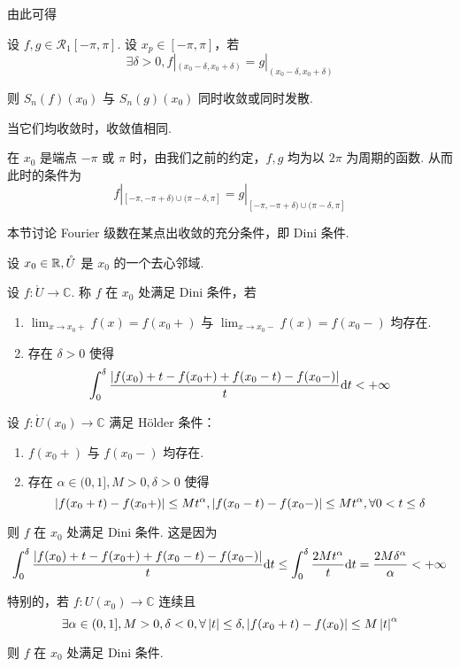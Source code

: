 由此可得

\begin{inference}[局部化准则]
    设 $f,g\in\mathcal{R}_1[-\pi,\pi]$. 设 $x_p\in[-\pi,\pi]$，若
$$
\exists\delta>0,f|_{(x_0-\delta,x_0+\delta)}=g|_{(x_0-\delta,x_0+\delta)}
$$

    则 $S_n(f)(x_0)$ 与 $S_n(g)(x_0)$ 同时收敛或同时发散.

    当它们均收敛时，收敛值相同.
\end{inference}

\begin{hint}
    在 $x_0$ 是端点 $-\pi$ 或 $\pi$ 时，由我们之前的约定，$f,g$ 均为以 $2\pi$ 为周期的函数. 从而此时的条件为
$$
f|_{[-\pi,-\pi+\delta)\cup(\pi-\delta,\pi]}=g|_{{[-\pi,-\pi+\delta)\cup(\pi-\delta,\pi]}}
$$
\end{hint}


本节讨论 Fourier 级数在某点出收敛的充分条件，即 Dini 条件.

\begin{definition}
    设 $x_0\in\mathbb{R},\mathring{U}$ 是 $x_0$ 的一个去心邻域.

    设 $f:\mathring{U}\to\mathbb{C}$. 称 $f$ 在 $x_0$ 处满足 Dini 条件，若

    \begin{enumerate}
        \item $\displaystyle\lim_{x\to x_0+}f(x)=f(x_0+)$ 与 $\displaystyle\lim_{x\to x_0-}f(x)=f(x_0-)$ 均存在.
        
        \item 存在 $\delta>0$ 使得
$$
\int_0^{\delta}\frac{\left\lvert{f(x_0)+t-f(x_0+)+f(x_0-t)-f(x_0-)}\right\rvert}{t}\mathrm{d} t<+\infty
$$
    \end{enumerate}
\end{definition}

\begin{example}
    设 $f:\mathring{U}(x_0)\to\mathbb{C}$ 满足 Hölder 条件：

    \begin{enumerate}
        \item $f(x_0+)$ 与 $f(x_0-)$ 均存在.
        
        \item 存在 $\alpha\in(0,1],M>0,\delta>0$ 使得
$$
\left\lvert{f(x_0+t)-f(x_0+)}\right\rvert\le Mt^{\alpha},\left\lvert{f(x_0-t)-f(x_0-)}\right\rvert\le Mt^{\alpha},\forall 0<t\le\delta
$$
    \end{enumerate}

    则 $f$ 在 $x_0$ 处满足 Dini 条件. 这是因为
$$
\int_0^{\delta}\frac{\left\lvert{f(x_0)+t-f(x_0+)+f(x_0-t)-f(x_0-)}\right\rvert}{t}\mathrm{d} t\le\int_0^\delta\frac{2Mt^{\alpha}}{t}\mathrm{d} t=\frac{2M\delta^{\alpha}}{\alpha}<+\infty
$$

    特别的，若 $f:U(x_0)\to\mathbb{C}$ 连续且
$$
\exists\alpha\in(0,1],M>0,\delta<0,\forall\left\lvert{t}\right\rvert\le\delta,\left\lvert{f(x_0+t)-f(x_0)}\right\rvert\le M\left\lvert{t}\right\rvert^\alpha
$$

    则 $f$ 在 $x_0$ 处满足 Dini 条件.
\end{example}

